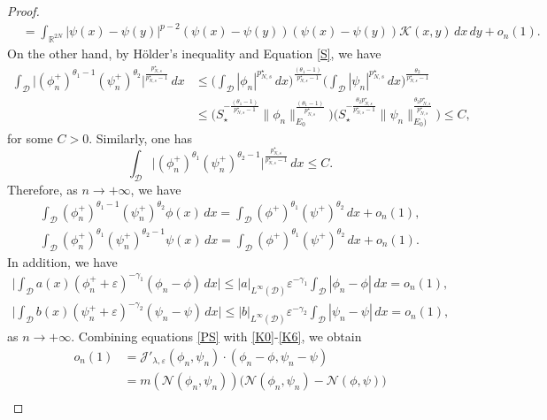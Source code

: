 \documentclass[reqno]{amsart}
\begin{document}
\begin{proof}
\begin{equation}
\begin{aligned}
&= \int_{\mathbb{R}^{2N}}|\psi(x)-\psi(y)|^{p-2}(\psi(x)
 -\psi(y))(\psi(x)-\psi(y))\mathcal{K}(x,y)\,dx\,dy+o_n(1).
\end{aligned}
\end{equation}
On the other hand, by H\"older's inequality and Equation \eqref{S}, we have
\begin{align*}
\int_\mathcal{D}\Big|( \phi^+_n)^{\theta_1-1} (\psi^+_n)^{\theta_2}
 \Big|^\frac{p^\star_{N,s}}{p^\star_{N,s}-1}\,dx
&\leq \Big(\int_\mathcal{D}|\phi_n|^{{p^\star_{N,s}}}\,dx
 \Big)^\frac{(\theta_1-1)}{p^\star_{N,s}-1}\Big(\int_\mathcal{D}
 |\psi_n|^{{p^\star_{N,s}}}\,dx\Big)^\frac{\theta_2 }{p^\star_{N,s}-1}\\
&\leq \Big(S_\star^{-\frac{(\theta_1-1)}{p^\star_{N,s}-1}}\|
 \phi_n\|_{E_0}^\frac{(\theta_1-1)}{p^\star_{N,s}}\Big)
 \Big(S_\star^{-\frac{\theta_2p^\star_{N,s}}{p^\star_{N,s}-1}}
 \| \psi_n\|_{E_0)}^\frac{\theta_2p^\star_{N,s}}{p^\star_{N,s}}\Big)
\leq  C,
\end{align*}
for some $C>0$. Similarly, one has
\[
\int_\mathcal{D}\Big|(\phi^+_n)^{\theta_1}( \psi^+_n)^{\theta_2-1}
\Big|^\frac{p^\star_{N,s}}{p^\star_{N,s}-1}\,dx\leq C.
\]
Therefore, as $n\to +\infty$, we have
\begin{gather}\label{K3}
\int_\mathcal{D} ( \phi^+_n)^{\theta_1-1} (\psi^+_n)^{\theta_2}\phi(x)\,dx
=\int_\mathcal{D} ( \phi^+)^{\theta_1} (\psi^+)^{\theta_2}\,dx+o_n(1), \\
\label{K4}
\int_\mathcal{D} ( \phi^+_n)^{\theta_1} (\psi^+_n)^{\theta_2-1}\psi(x)\,dx
=\int_\mathcal{D} ( \phi^+)^{\theta_1} (\psi^+)^{\theta_2}\,dx+o_n(1).
\end{gather}
In addition, we have
\begin{gather}\label{K5}
\Big|\int_\mathcal{D}a(x)(\phi_n^++\varepsilon)^{-\gamma_1}(\phi_n-\phi)\,dx \Big|
\leq |a|_{L^\infty(\mathcal{D})}\varepsilon^{-\gamma_1} \int_\mathcal{D}|\phi_n
 -\phi|\,dx  =o_n(1), \\
\label{K6}
\Big|\int_\mathcal{D}b(x)(\psi_n^++\varepsilon)^{-\gamma_2}(\psi_n-\psi)\,dx \Big|
\leq |b|_{L^\infty(\mathcal{D})}\varepsilon^{-\gamma_2} \int_\mathcal{D}|\psi_n
 -\psi|\,dx =o_n(1),
\end{gather}
as $n\to +\infty$.
Combining equations \eqref{PS} with \eqref{K0}-\eqref{K6}, we obtain
\begin{align*}
o_n(1)
&=\mathcal{J}'_{\lambda,\varepsilon}(\phi_n,\psi_n)\cdot(\phi_n-\phi,\psi_n-\psi)\\
&=m(\mathcal{N}(\phi_n,\psi_n))\Big(\mathcal{N}(\phi_n,\psi_n)-\mathcal{N}
 (\phi,\psi)\Big)\\

\end{align*}
\end{proof}
\end{document}

